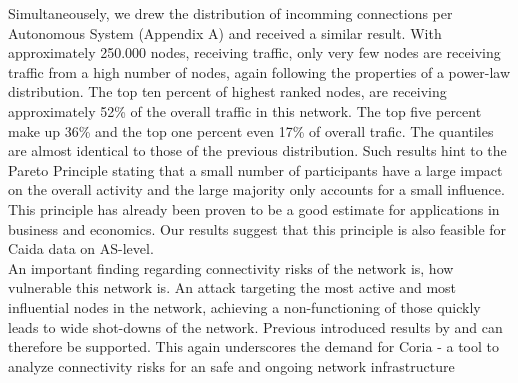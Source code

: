 \documentclass[conference, 11pt]{IEEEtran}
\begin{document}

Simultaneousely, we drew the distribution of incomming connections per Autonomous System (Appendix A) and received a similar result. With approximately 250.000 nodes, receiving traffic, only very few nodes are receiving traffic from a high number of nodes, again following the properties of a power-law distribution. The top ten percent of highest ranked nodes, are receiving approximately 52\% of the overall traffic in this network. The top five percent make up 36\% and the top one percent even 17\% of overall trafic. The quantiles are almost identical to those of the previous distribution. Such results hint to the Pareto Principle stating that a small number of participants have a large impact on the overall activity and the large majority only accounts for a small influence. This principle has already been proven to be a good estimate for applications in business and economics. Our results suggest that this principle is also feasible for Caida data on AS-level.  \\ 



 


An important finding regarding connectivity risks of the network is, how vulnerable this network is. An attack targeting the most active and most influential nodes in the network, achieving a non-functioning of those quickly leads to wide shot-downs of the network. Previous introduced results by \cite{powerlawCitation} and \cite{owningInternet} can therefore be supported.  This again underscores the demand for Coria - a tool to analyze connectivity risks for an safe and ongoing network infrastructure 
\end{document}
